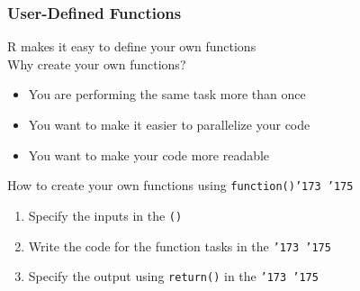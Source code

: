 \documentclass{beamer}\usepackage[]{graphicx}\usepackage[]{color}
\begin{document}
\begin{frame}\frametitle{User-Defined Functions}
    R makes it easy to define your own functions \\
    \vspace{2ex}
    Why create your own functions?
    \begin{itemize}
        \item You are performing the same task more than once
        \item You want to make it easier to parallelize your code
        \item You want to make your code more readable
    \end{itemize}
    \vspace{2ex}
    How to create your own functions using \texttt{function()\char '173 \char '175}
    \begin{enumerate}
        \item Specify the inputs in the \texttt{()}
        \item Write the code for the function tasks in the \texttt{\char '173 \char '175}
        \item Specify the output using \texttt{return()} in the \texttt{\char '173 \char '175}
    \end{enumerate}
\end{frame}
\end{document}
